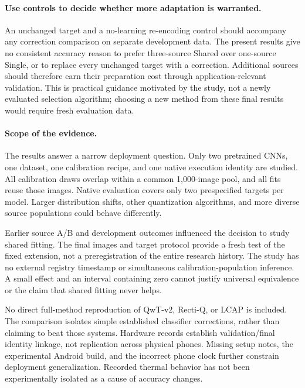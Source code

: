 \documentclass[10pt,twocolumn]{article}
\begin{document}
\paragraph{Use controls to decide whether more adaptation is warranted.}
An unchanged target and a no-learning re-encoding control should accompany any correction comparison on separate development data. The present results give no consistent accuracy reason to prefer three-source Shared over one-source Single, or to replace every unchanged target with a correction. Additional sources should therefore earn their preparation cost through application-relevant validation. This is practical guidance motivated by the study, not a newly evaluated selection algorithm; choosing a new method from these final results would require fresh evaluation data.

\paragraph{Scope of the evidence.}
The results answer a narrow deployment question. Only two pretrained CNNs, one dataset, one calibration recipe, and one native execution identity are studied. All calibration draws overlap within a common 1,000-image pool, and all fits reuse those images. Native evaluation covers only two prespecified targets per model. Larger distribution shifts, other quantization algorithms, and more diverse source populations could behave differently.

Earlier source A/B and development outcomes influenced the decision to study shared fitting. The final images and target protocol provide a fresh test of the fixed extension, not a preregistration of the entire research history. The study has no external registry timestamp or simultaneous calibration-population inference. A small effect and an interval containing zero cannot justify universal equivalence or the claim that shared fitting never helps.

No direct full-method reproduction of QwT-v2, Recti-Q, or LCAP is included. The comparison isolates simple established classifier corrections, rather than claiming to beat those systems. Hardware records establish validation/final identity linkage, not replication across physical phones. Missing setup notes, the experimental Android build, and the incorrect phone clock further constrain deployment generalization. Recorded thermal behavior has not been experimentally isolated as a cause of accuracy changes.
\end{document}
